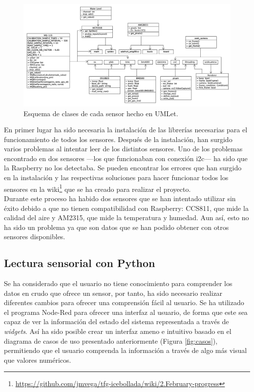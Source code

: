 \begin{figure} [h!]
  \begin{center}
    \includegraphics[width=14cm]{figs/umlet}
  \end{center}
  \caption{Esquema de clases de cada sensor hecho en UMLet.}
  \label{fig:umlet}
\end{figure}

En primer lugar ha sido necesaria la instalación de las librerías necesarias para el funcionamiento de todos los sensores. Después de la instalación, han surgido varios problemas al intentar leer de los distintos sensores. Uno de los problemas encontrado en dos sensores ---los que funcionaban con conexión i2c--- ha sido que la Raspberry no los detectaba. Se pueden encontrar los errores que han surgido en la instalación y las respectivas soluciones para hacer funcionar todos los sensores en la wiki\footnote{\url{https://github.com/jmvega/tfg-icebollada/wiki/2.February-progress}} que se ha creado para realizar el proyecto.\\

Durante este proceso ha habido dos sensores que se han intentado utilizar sin éxito debido a que no tienen compatibilidad con Raspberry: CCS811, que mide la calidad del aire y AM2315, que mide la temperatura y humedad. Aun así, esto no ha sido un problema ya que son datos que se han podido obtener con otros sensores disponibles.\\

\subsection{Lectura sensorial con Python}
\label{sec:ficheropython}
Se ha considerado que el usuario no tiene conocimiento para comprender los datos en crudo que ofrece un sensor, por tanto, ha sido necesario realizar diferentes cambios para ofrecer una comprensión fácil al usuario. Se ha utilizado el programa Node-Red para ofrecer una interfaz al usuario, de forma que este sea capaz de ver la información del estado del sistema representada a través de \textit{widgets}. Así ha sido posible crear un interfaz ameno e intuitivo basado en el diagrama de casos de uso presentado anteriormente (Figura \ref{fig:casos}), permitiendo que el usuario comprenda la información a través de algo más visual que valores numéricos.\\

